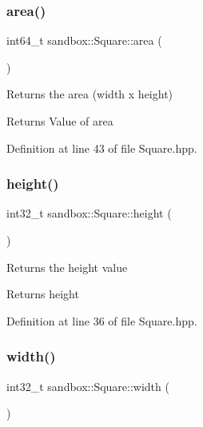 \subsubsection{\texorpdfstring{area()}{area()}}
{\footnotesize\ttfamily int64\+\_\+t sandbox\+::\+Square\+::area (\begin{DoxyParamCaption}{ }\end{DoxyParamCaption})\hspace{0.3cm}{\ttfamily [inline]}}

Returns the area (width x height) \begin{DoxyReturn}{Returns}
Value of area 
\end{DoxyReturn}


Definition at line 43 of file Square.\+hpp.

\mbox{\label{classsandbox_1_1_square_a5053820765994fa8008415ebbad9a76e}} 
\subsubsection{\texorpdfstring{height()}{height()}}
{\footnotesize\ttfamily int32\+\_\+t sandbox\+::\+Square\+::height (\begin{DoxyParamCaption}{ }\end{DoxyParamCaption})\hspace{0.3cm}{\ttfamily [inline]}}

Returns the height value \begin{DoxyReturn}{Returns}
height 
\end{DoxyReturn}


Definition at line 36 of file Square.\+hpp.

\mbox{\label{classsandbox_1_1_square_a5f344e42d3d545919ca567101c49a027}} 
\subsubsection{\texorpdfstring{width()}{width()}}
{\footnotesize\ttfamily int32\+\_\+t sandbox\+::\+Square\+::width (\begin{DoxyParamCaption}{ }\end{DoxyParamCaption})\hspace{0.3cm}{\ttfamily [inline]}}

